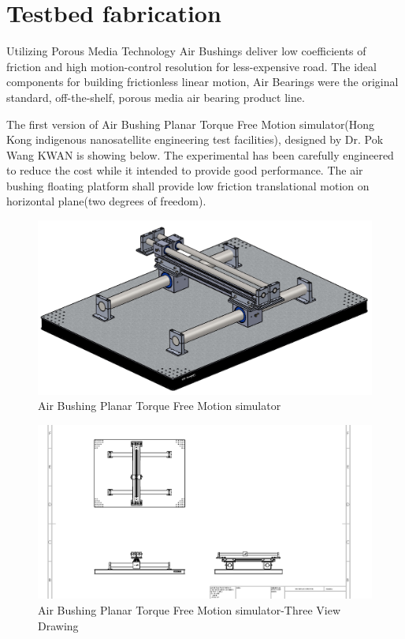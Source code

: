 \section{Testbed fabrication}
Utilizing Porous Media Technology Air Bushings deliver low coefficients of friction and high motion-control resolution for less-expensive road. The ideal components for building frictionless linear motion, Air Bearings were the original standard, off-the-shelf, porous media air bearing product line. 

The first version of Air Bushing Planar Torque Free Motion simulator(Hong Kong indigenous nanosatellite engineering test facilities), designed by Dr. Pok Wang KWAN is showing below. The experimental has been carefully engineered to reduce the cost while it intended to provide good performance. The air bushing floating platform shall provide low friction translational motion on horizontal plane(two degrees of freedom).

\begin{figure}[H]
\centering
\includegraphics[width=\textwidth]{fig/DOE/Original3DView}
\caption{Air Bushing Planar Torque Free Motion simulator}
\end{figure}

\begin{figure}[H]
\centering
\includegraphics[width=\textwidth]{fig/DOE/3viewdrawing}
\caption{Air Bushing Planar Torque Free Motion simulator-Three View Drawing}
\end{figure}

